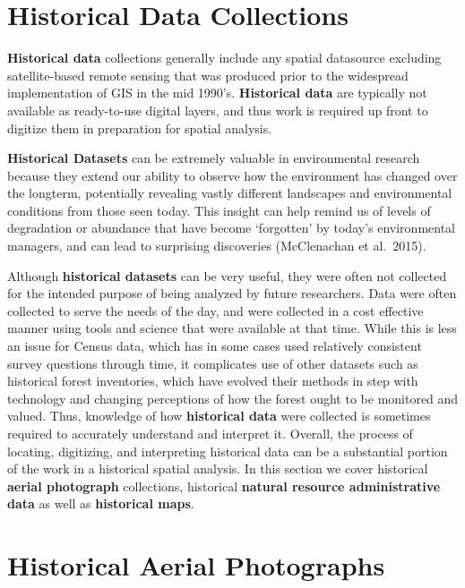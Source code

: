 \documentclass[
]{book}
\begin{document}
\hypertarget{historical-data-collections}{%
\section{Historical Data Collections}\label{historical-data-collections}}

\textbf{Historical data} collections generally include any spatial datasource excluding satellite-based remote sensing that was produced prior to the widespread implementation of GIS in the mid 1990's. \textbf{Historical data} are typically not available as ready-to-use digital layers, and thus work is required up front to digitize them in preparation for spatial analysis.

\textbf{Historical Datasets} can be extremely valuable in environmental research because they extend our ability to observe how the environment has changed over the longterm, potentially revealing vastly different landscapes and environmental conditions from those seen today. This insight can help remind us of levels of degradation or abundance that have become `forgotten' by today's environmental managers, and can lead to surprising discoveries (McClenachan et al.~2015).

Although \textbf{historical datasets} can be very useful, they were often not collected for the intended purpose of being analyzed by future researchers. Data were often collected to serve the needs of the day, and were collected in a cost effective manner using tools and science that were available at that time. While this is less an issue for Census data, which has in some cases used relatively consistent survey questions through time, it complicates use of other datasets such as historical forest inventories, which have evolved their methods in step with technology and changing perceptions of how the forest ought to be monitored and valued. Thus, knowledge of how \textbf{historical data} were collected is sometimes required to accurately understand and interpret it. Overall, the process of locating, digitizing, and interpreting historical data can be a substantial portion of the work in a historical spatial analysis. In this section we cover historical \textbf{aerial photograph} collections, historical \textbf{natural resource administrative data} as well as \textbf{historical maps}.

\hypertarget{historical-aerial-photographs}{%
\section{Historical Aerial Photographs}\label{historical-aerial-photographs}}
\end{document}
